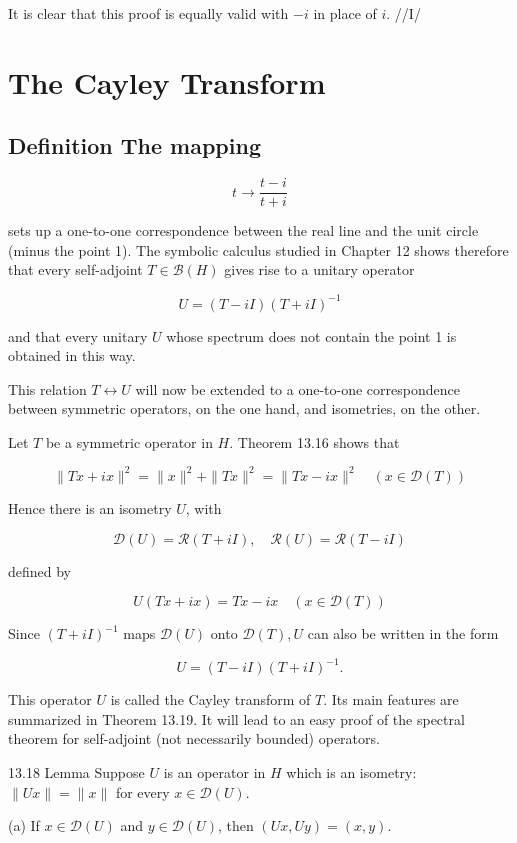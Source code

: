 \documentclass[10pt]{article}
\begin{document}
It is clear that this proof is equally valid with $-i$ in place of $i$. //I/

\section{The Cayley Transform}
\subsection{Definition The mapping}
$$
t \rightarrow \frac{t-i}{t+i}
$$

sets up a one-to-one correspondence between the real line and the unit circle (minus the point 1). The symbolic calculus studied in Chapter 12 shows therefore that every self-adjoint $T \in \mathscr{B}(H)$ gives rise to a unitary operator

$$
U=(T-i I)(T+i I)^{-1}
$$

and that every unitary $U$ whose spectrum does not contain the point 1 is obtained in this way.

This relation $T \leftrightarrow U$ will now be extended to a one-to-one correspondence between symmetric operators, on the one hand, and isometries, on the other.

Let $T$ be a symmetric operator in $H$. Theorem 13.16 shows that

$$
\|T x+i x\|^{2}=\|x\|^{2}+\|T x\|^{2}=\|T x-i x\|^{2} \quad(x \in \mathscr{D}(T))
$$

Hence there is an isometry $U$, with

$$
\mathscr{D}(U)=\mathscr{R}(T+i I), \quad \mathscr{R}(U)=\mathscr{R}(T-i I)
$$

defined by

$$
U(T x+i x)=T x-i x \quad(x \in \mathscr{D}(T))
$$

Since $(T+i I)^{-1}$ maps $\mathscr{D}(U)$ onto $\mathscr{D}(T), U$ can also be written in the form

$$
U=(T-i I)(T+i I)^{-1} .
$$

This operator $U$ is called the Cayley transform of $T$. Its main features are summarized in Theorem 13.19. It will lead to an easy proof of the spectral theorem for self-adjoint (not necessarily bounded) operators.

13.18 Lemma Suppose $U$ is an operator in $H$ which is an isometry: $\|U x\|=\|x\|$ for every $x \in \mathscr{D}(U)$.

(a) If $x \in \mathscr{D}(U)$ and $y \in \mathscr{D}(U)$, then $(U x, U y)=(x, y)$.
\end{document}
